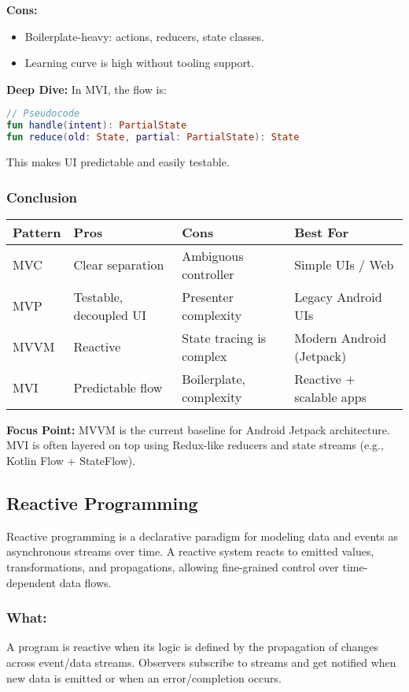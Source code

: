 \documentclass[a4paper,12pt]{article}
\begin{document}
\textbf{Cons:}
\begin{itemize}
  \item Boilerplate-heavy: actions, reducers, state classes.
  \item Learning curve is high without tooling support.
\end{itemize}

\textbf{Deep Dive:} In MVI, the flow is:
\begin{lstlisting}[language=Kotlin]
// Pseudocode
fun handle(intent): PartialState
fun reduce(old: State, partial: PartialState): State
\end{lstlisting}
This makes UI predictable and easily testable.

\subsubsection{Conclusion}

\begin{center}
\begin{tabular}{|l|l|l|l|}
\hline
\textbf{Pattern} & \textbf{Pros} & \textbf{Cons} & \textbf{Best For} \\\hline
MVC & Clear separation & Ambiguous controller & Simple UIs / Web \\\hline
MVP & Testable, decoupled UI & Presenter complexity & Legacy Android UIs \\\hline
MVVM & Reactive & State tracing is complex & Modern Android (Jetpack) \\\hline
MVI & Predictable flow & Boilerplate, complexity & Reactive + scalable apps \\\hline
\end{tabular}
\end{center}

\textbf{Focus Point:} MVVM is the current baseline for Android Jetpack architecture. MVI is often layered on top using Redux-like reducers and state streams (e.g., Kotlin Flow + StateFlow).

\subsection{Reactive Programming}

Reactive programming is a declarative paradigm for modeling data and events as asynchronous streams over time. A reactive system reacts to emitted values, transformations, and propagations, allowing fine-grained control over time-dependent data flows.

\subsubsection{What:}
A program is reactive when its logic is defined by the propagation of changes across event/data streams. Observers subscribe to streams and get notified when new data is emitted or when an error/completion occurs.
\end{document}
